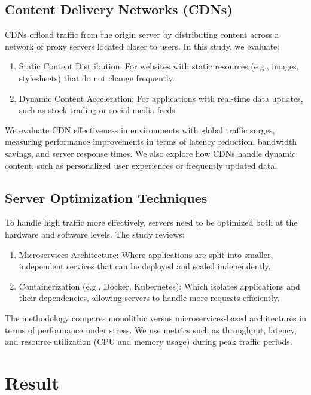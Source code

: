 \documentclass{article}
\begin{document}
\subsection{Content Delivery Networks (CDNs)}
CDNs offload traffic from the origin server by distributing content across a network of proxy servers located closer to users. In this study, we evaluate:
\begin{enumerate}
    \item Static Content Distribution: For websites with static resources (e.g., images, stylesheets) that do not change frequently.
    \item Dynamic Content Acceleration: For applications with real-time data updates, such as stock trading or social media feeds.
\end{enumerate}
We evaluate CDN effectiveness in environments with global traffic surges, measuring performance improvements in terms of latency reduction, bandwidth savings, and server response times. We also explore how CDNs handle dynamic content, such as personalized user experiences or frequently updated data.

\subsection{Server Optimization Techniques}

To handle high traffic more effectively, servers need to be optimized both at the hardware and software levels. The study reviews:
\begin{enumerate}
    \item Microservices Architecture: Where applications are split into smaller, independent services that can be deployed and scaled independently.
    \item Containerization (e.g., Docker, Kubernetes): Which isolates applications and their dependencies, allowing servers to handle more requests efficiently.
\end{enumerate}

The methodology compares monolithic versus microservices-based architectures in terms of performance under stress. We use metrics such as throughput, latency, and resource utilization (CPU and memory usage) during peak traffic periods.

\section{Result}
\end{document}
